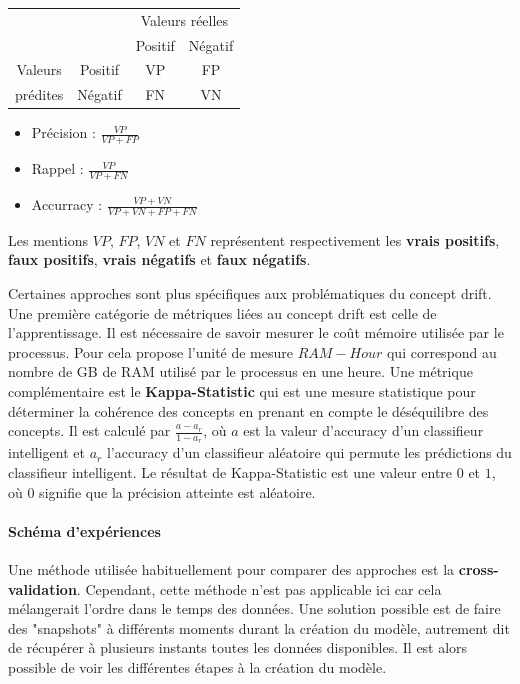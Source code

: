 \documentclass[utf8]{stageM2R} %
\theoremstyle{remark}
\renewcommand{\emph}{\textbf}
\begin{document}
 \begin{multicols}{2}
\begin{tabular}{|c|c|c|c|}
	\cline{3-4}
	\multicolumn{2}{c|}{}&\multicolumn{2}{|c|}{Valeurs réelles}\\
	\cline{3-4}
	\multicolumn{2}{c|}{}&Positif&Négatif\\
	\hline
	Valeurs&Positif&VP&FP\\
	\cline{2-4}
	prédites&Négatif&FN&VN\\
	\hline
	\end{tabular}
\vfill
\columnbreak
\begin{itemize}
\item Précision : $\frac{VP}{VP+FP}$
\item Rappel : $\frac{VP}{VP+FN}$
\item Accurracy : $\frac{VP+VN}{VP+VN+FP+FN}$
\end{itemize}
\end{multicols}
 Les mentions $VP$, $FP$, $VN$ et $FN$ représentent respectivement les \emph{vrais positifs}, \emph{faux positifs}, \emph{vrais négatifs} et \emph{faux négatifs}.

 Certaines approches sont plus spécifiques aux problématiques du concept drift.
Une première catégorie de métriques liées au concept drift est celle de l'apprentissage. Il est nécessaire de savoir mesurer le coût mémoire utilisée par le processus. Pour cela \cite{Bifet2010a} propose l'unité de mesure $RAM-Hour$ qui correspond au nombre de GB de RAM utilisé par le processus en une heure.
Une métrique complémentaire est le \emph{Kappa-Statistic} qui est une mesure statistique pour déterminer la cohérence des concepts en prenant en compte le déséquilibre des  concepts. Il est calculé par $\frac{a-a_r}{1-a_r}$, où $a$ est la valeur d'accuracy d'un classifieur intelligent et $a_r$ l'accuracy d'un classifieur aléatoire qui permute les prédictions du classifieur intelligent. Le résultat de Kappa-Statistic est une valeur entre $0$ et $1$, où $0$ signifie  que la précision atteinte est aléatoire.

\paragraph{Schéma d'expériences}
Une méthode utilisée habituellement pour comparer des approches est la \emph{cross-validation}. Cependant, cette méthode n'est pas applicable ici car cela mélangerait l'ordre dans le temps des données. Une solution possible est de faire des "snapshots" à différents moments durant la création du modèle, autrement dit de récupérer à plusieurs instants toutes les données disponibles. Il est alors possible de voir les différentes étapes à la création du modèle.
\end{document}
